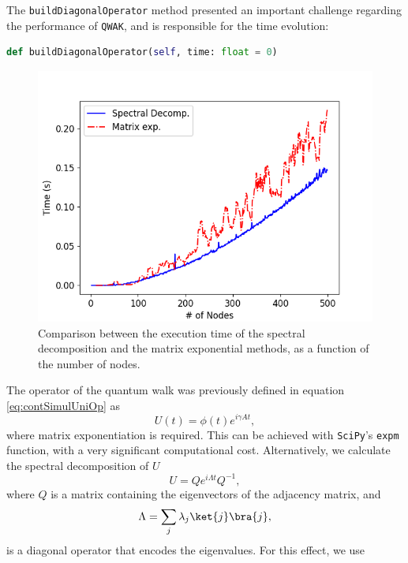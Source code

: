 \documentclass[../../dissertation.tex]{subfiles}
\begin{document}
The \texttt{buildDiagonalOperator} method presented an important challenge
regarding the performance of \texttt{QWAK}, and is responsible for the time
evolution: 
\begin{lstlisting}[style=commands,mathescape,language=Python]
    def buildDiagonalOperator(self, time: float = 0)
\end{lstlisting}
\begin{figure}[!h]
	\centering
	\includegraphics[scale=0.50]{img/QWAK/expmVsDiag.png}
	\caption{Comparison between the execution time of the spectral decomposition and the matrix exponential methods, as a function of the number of nodes.} 
	\label{fig:expmVsDiag}
\end{figure}
The operator of the quantum walk was previously defined in equation
\eqref{eq:contSimulUniOp} as 
\begin{equation} 
    U(t) = \phi(t) e^{i\gamma A t},
\end{equation} where matrix exponentiation is required. This can be achieved
with \texttt{SciPy}'s \texttt{expm} function, with a very significant
computational cost. Alternatively, we calculate the spectral decomposition of
$U$
\begin{equation}
    U = Q e^{i\Lambda t} Q^{-1} ,
\end{equation}
where $Q$ is a matrix containing the eigenvectors of the adjacency matrix, and 
\begin{equation}
    \Lambda = \sum_{j} \lambda_j \ket{j}\bra{j},
\end{equation}
is a diagonal operator that encodes the eigenvalues. For this effect, we use
\end{document}
